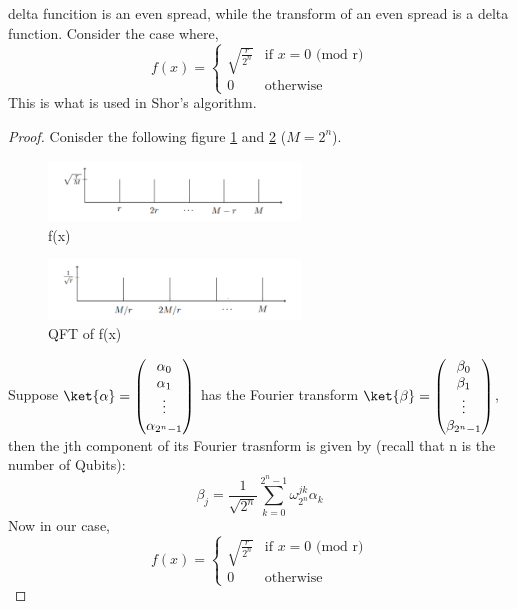 \documentclass[12pt, oneside]{book}
\theoremstyle{definition}
\theoremstyle{definition}
\theoremstyle{remark}
\begin{document}
\begin{itemize}
    delta funcition is an even spread, while the transform of an even spread is a delta function.
    Consider the case where,
    \[
    f(x)=\begin{cases} \sqrt{\frac{r}{2^n}} & \text{if } x=0 \text{ (mod r)} \\ 0 & \text{otherwise}\end{cases}
    \]
    This is what is used in Shor's algorithm. 
    \begin{proof}
        Conisder the following figure \ref{fig:f(x)} and \ref{fig:QFT_f(x)} ($M=2^n$).
        \begin{figure}[H]
            \centering
            \includegraphics[width=0.6\textwidth]{../images/f(x).png}
            \caption{f(x)}
            \label{fig:f(x)}
        \end{figure}
        \begin{figure}[H]
            \centering
            \includegraphics[width=0.6\textwidth]{../images/QFT_f(x).png}
            \caption{QFT of f(x)}
            \label{fig:QFT_f(x)}
        \end{figure}
        Suppose $\ket{\alpha}=\begin{pmatrix} \alpha_0 \\ \alpha_1 \\ \vdots \\ \alpha_{2^n-1} \end{pmatrix}$ has the Fourier transform
        $\ket{\beta}=\begin{pmatrix} \beta_0 \\ \beta_1 \\ \vdots \\ \beta_{2^n-1} \end{pmatrix}$, then the jth component of its Fourier trasnform is given by (recall that n is the number of Qubits):
        \[ \beta_j=\dfrac{1}{\sqrt{2^n}}\sum_{k=0}^{2^n-1}\omega_{2^n}^{jk}\alpha_k \]
        Now in our case, 
        \[
            f(x)=\begin{cases} \sqrt{\frac{r}{2^n}} & \text{if } x=0 \text{ (mod r)} \\ 0 & \text{otherwise}\end{cases}
\]
\end{proof}
\end{itemize}
\end{document}

